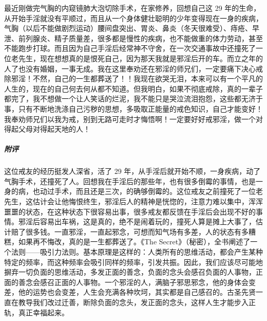 \begin{case}
    最近刚做完气胸的内窥镜肺大泡切除手术，在家修养，回想自己这 29 年的生命，从开始手淫就没有平顺过，而且从一个身体健壮聪明的少年变得现在一身的疾病，气胸（以后不能做剧烈运动）腰间盘突出、胃炎、鼻炎（冬天很难受）、痔疮、早泄、前列腺炎、精子质量差，很多都是慢性的疾病，也不能做重的体力劳动，甚至不能跑步打球。而且因为自己手淫后经常神不守舍，在一次交通事故中还撞死了一位老先生，现在想想真的是恨死自己，因为那天我就是邪淫后开的车。而立之年的人了也没有婚姻，一事无成。我在这里奉劝还在邪淫的师兄们，一定要痛下决心戒除邪淫！不然，自己的一生都葬送了！！我现在欲哭无泪，本来可以有一个平凡的人生的，现在的自己何去何从都不知道。但我明白，如果不彻底戒除，真的一辈子都完了，我不想做一个让人笑话的烂泥，我不能只是哭泣流泪抱怨，这些都无济于事，只有不断地洗涤自己污秽的思想，多吸取正能量的戒色知识，自己才能变好！我奉劝师兄们以我为戒，别到无路可走时才悔悟啊！一定要好好戒邪淫，做一个对得起父母对得起天地的人！
    \subparagraph{附评} 这位戒友的经历挺发人深省，活了 29 年，从手淫后就开始不顺，一身疾病，动了气胸手术，还撞死了人。回想我在手淫后的那些年，也有很多倒霉的事情，也是一身的病，也动过手术，而且还是三次，的确够倒霉的。这位戒友之前撞死了一位老先生，这估计会让他悔恨终生，邪淫后人的精神是恍惚的，注意力难以集中，浑浑噩噩的状态，在这种状态下很容易出事，很多戒友都反馈在手淫后会出现不好的事情。邪淫后容易出车祸，这是真的，绝不是闹着玩的，撞死人算是摊上大事了，估计赔了很多钱。一直邪淫，一直起邪念，可想而知气场有多差，人的状态有多糟糕，如果再不悔改，真的是一生都葬送了。《The Secret》（秘密），全书阐述了一个法则——吸引力法则。基本原理是这样的：人类所有的思维活动，都会产生某种特定的频率，而这种频率会吸引同样的频率，引发共振。因此，我们应该尽可能地摒弃一切负面的思维活动，多发正面的善念，负面的念头会感召负面的人事物，正面的善念会感召正面的人事物。一个邪淫的人，满脑子邪思邪念，他的身体会变差，他的运势也会变差，人生会充满各种坎坷，其实都是自己感召的。古圣先贤一直在教导我们改过迁善，断除负面的念头，发正面的念头，这样人生才能步入正轨，真正幸福起来。
\end{case}

